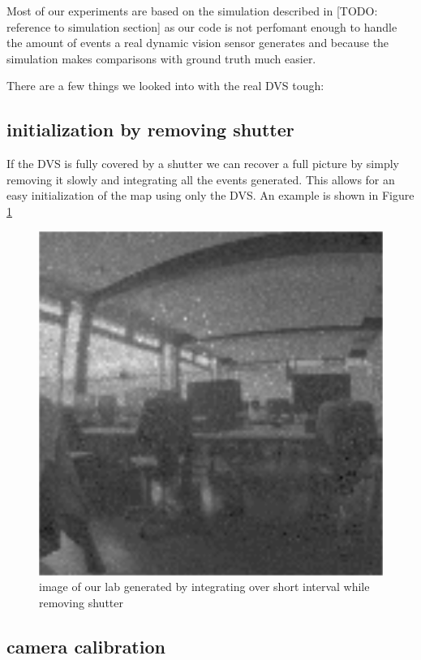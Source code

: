 Most of our experiments are based on the simulation described in [TODO:
reference to simulation section] as our code is not perfomant enough to handle
the amount of events a real dynamic vision sensor generates and because the
simulation makes comparisons with ground truth much easier.

There are a few things we looked into with the real DVS tough:

\subsection{initialization by removing shutter}

If the DVS is fully covered by a shutter we can recover a full picture by
simply removing it slowly and integrating all the events generated. This allows
for an easy initialization of the map using only the DVS. An example is shown in Figure \ref{fig:shutter_integration}

\begin{figure}
\includegraphics[width=\linewidth]{images/PCLab_integrated.png}
\caption{image of our lab generated by integrating over short interval while removing shutter}
\label{fig:shutter_integration}
\end{figure}


\subsection{camera calibration}

